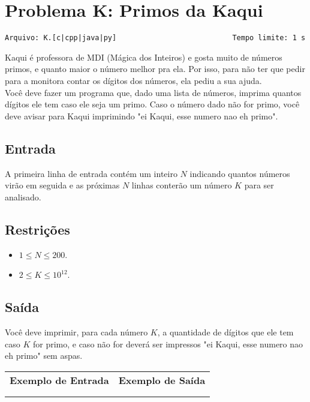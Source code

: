\section{Problema K: Primos da Kaqui}
\vspace{-0.52cm}
\noindent \begin{verbatim}Arquivo: K.[c|cpp|java|py]                           Tempo limite: 1 s
\end{verbatim}

Kaqui é professora de MDI (Mágica dos Inteiros) e gosta muito de números primos, e quanto maior o número melhor pra ela. Por isso, para não ter que pedir para a monitora contar os dígitos dos números, ela pediu a sua ajuda. \\ Você deve fazer um programa que, dado uma lista de números, imprima quantos dígitos ele tem caso ele seja um primo. Caso o número dado não for primo, você deve avisar para Kaqui imprimindo "ei Kaqui, esse numero nao eh primo".

\subsection*{Entrada}

A primeira linha de entrada contém um inteiro $N$ indicando quantos números virão em seguida e as próximas $N$ linhas conterão um número $K$ para ser analisado.

\subsection*{Restrições}
\begin{itemize}
    \item $1 \le N \le 200$.
    \item $2 \le K \le 10^{12}$.
\end{itemize}

\subsection*{Saída}

Você deve imprimir, para cada número $K$, a quantidade de dígitos que ele tem caso $K$ for primo, e caso não for deverá ser impressos "ei Kaqui, esse numero nao eh primo" sem aspas.

\begin{flushleft}
\begin{tabularx}{1.01\textwidth}{ | p{6cm} | p{10cm} | }
\hline
\textbf{Exemplo de Entrada} & \textbf{Exemplo de Saída} \\

&

\\
\hline

&

\\
\hline
\end{tabularx}
\end{flushleft}
